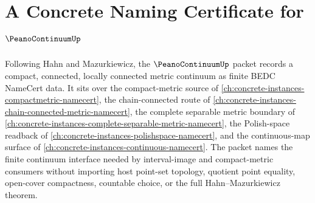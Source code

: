 \chapter{A Concrete Naming Certificate for $\PeanoContinuumUp$}
\label{ch:concrete-instances-peano-continuum-namecert}

Following Hahn and Mazurkiewicz, the $\PeanoContinuumUp$ packet records a compact, connected, locally connected metric continuum as finite BEDC NameCert data. It sits over the compact-metric source of \autoref{ch:concrete-instances-compactmetric-namecert}, the chain-connected route of \autoref{ch:concrete-instances-chain-connected-metric-namecert}, the complete separable metric boundary of \autoref{ch:concrete-instances-complete-separable-metric-namecert}, the Polish-space readback of \autoref{ch:concrete-instances-polishspace-namecert}, and the continuous-map surface of \autoref{ch:concrete-instances-continuous-namecert}. The packet names the finite continuum interface needed by interval-image and compact-metric consumers without importing host point-set topology, quotient point equality, open-cover compactness, countable choice, or the full Hahn--Mazurkiewicz theorem.

